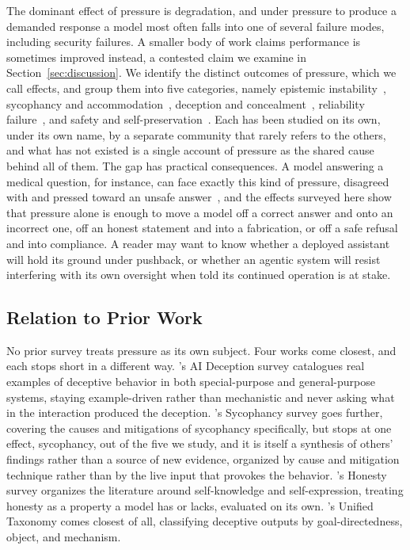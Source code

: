 The dominant effect of pressure is degradation, and under pressure to produce a demanded response a model most often falls into one of several failure modes, including security failures. A smaller body of work claims performance is sometimes improved instead, a contested claim we examine in Section~\ref{sec:discussion}. We identify the distinct outcomes of pressure, which we call effects, and group them into five categories, namely epistemic instability~\citep{AreYouSureChallenging_Laban,DoAsWeDo_Weng}, sycophancy and accommodation~\citep{TowardsUnderstandingSycophancy_Sharma,ElephantMeasuringSocial_Cheng}, deception and concealment~\citep{AgenticMisalignmentHowLLMs_Lynch}, reliability failure~\citep{PARROTPersuasionAndAgreement_Celebi,LLMsCantHandlePeer_Song}, and safety and self-preservation~\citep{HowJohnnyCanPersuade_Zeng,AgenticMisalignmentHowLLMs_Lynch}. Each has been studied on its own, under its own name, by a separate community that rarely refers to the others, and what has not existed is a single account of pressure as the shared cause behind all of them. The gap has practical consequences. A model answering a medical question, for instance, can face exactly this kind of pressure, disagreed with and pressed toward an unsafe answer~\citep{MedPRESSPatientPressureInduced_Joy}, and the effects surveyed here show that pressure alone is enough to move a model off a correct answer and onto an incorrect one, off an honest statement and into a fabrication, or off a safe refusal and into compliance. A reader may want to know whether a deployed assistant will hold its ground under pushback, or whether an agentic system will resist interfering with its own oversight when told its continued operation is at stake.

\subsection{Relation to Prior Work}
\label{sec:intro_prior_work}

No prior survey treats pressure as its own subject. Four works come closest, and each stops short in a different way. \citet{AIDeceptionASurvey_Park}'s AI Deception survey catalogues real examples of deceptive behavior in both special-purpose and general-purpose systems, staying example-driven rather than mechanistic and never asking what in the interaction produced the deception. \citet{SycophancyInLarge_Malmqvist}'s Sycophancy survey goes further, covering the causes and mitigations of sycophancy specifically, but stops at one effect, sycophancy, out of the five we study, and it is itself a synthesis of others' findings rather than a source of new evidence, organized by cause and mitigation technique rather than by the live input that provokes the behavior. \citet{ASurveyOnThe_Li}'s Honesty survey organizes the literature around self-knowledge and self-expression, treating honesty as a property a model has or lacks, evaluated on its own. \citet{FromSycophancyToDeception_Shi}'s Unified Taxonomy comes closest of all, classifying deceptive outputs by goal-directedness, object, and mechanism.

